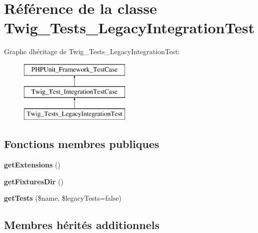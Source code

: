 \hypertarget{class_twig___tests___legacy_integration_test}{}\section{Référence de la classe Twig\+\_\+\+Tests\+\_\+\+Legacy\+Integration\+Test}
\label{class_twig___tests___legacy_integration_test}
Graphe d\textquotesingle{}héritage de Twig\+\_\+\+Tests\+\_\+\+Legacy\+Integration\+Test\+:\begin{figure}[H]
\begin{center}
\leavevmode
\includegraphics[height=3.000000cm]{class_twig___tests___legacy_integration_test}
\end{center}
\end{figure}
\subsection*{Fonctions membres publiques}
\begin{DoxyCompactItemize}
\item 
{\bfseries get\+Extensions} ()\hypertarget{class_twig___tests___legacy_integration_test_a0bf1cdb692f876fae6acd2bfbb548244}{}\label{class_twig___tests___legacy_integration_test_a0bf1cdb692f876fae6acd2bfbb548244}

\item 
{\bfseries get\+Fixtures\+Dir} ()\hypertarget{class_twig___tests___legacy_integration_test_a497128a4b6ea4dae7ab2be44290823aa}{}\label{class_twig___tests___legacy_integration_test_a497128a4b6ea4dae7ab2be44290823aa}

\item 
{\bfseries get\+Tests} (\$name, \$legacy\+Tests=false)\hypertarget{class_twig___tests___legacy_integration_test_a22f6ec737c4c30659ba90780e5f20fd3}{}\label{class_twig___tests___legacy_integration_test_a22f6ec737c4c30659ba90780e5f20fd3}

\end{DoxyCompactItemize}
\subsection*{Membres hérités additionnels}


